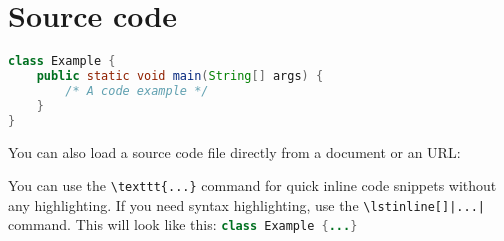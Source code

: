 \documentclass{article}
\begin{document}
\section*{Source code}

\begin{lstlisting}[language = java]
class Example {
    public static void main(String[] args) {
        /* A code example */
    }
}
\end{lstlisting}

\bigskip

\noindent You can also load a source code file directly from a document or an
URL:

\bigskip



\bigskip

\noindent You can use the \texttt{\textbackslash texttt\{...\}} command for
quick inline code snippets without any highlighting. If you need syntax
highlighting, use the \texttt{\textbackslash lstinline[]|...|} command. This
will look like this: \lstinline[language = Java]|class Example {...}|
\end{document}
